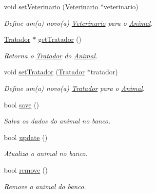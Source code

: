 \begin{DoxyCompactItemize}
void \hyperlink{classAnimal_ace9b58ea47057261292ce42a4edd2870}{set\+Veterinario} (\hyperlink{classVeterinario}{Veterinario} $\ast$veterinario)
\begin{DoxyCompactList}\small\item\em Define um(a) novo(a) \hyperlink{classVeterinario}{Veterinario} para o \hyperlink{classAnimal}{Animal}. \end{DoxyCompactList}\item 
\hyperlink{classTratador}{Tratador} $\ast$ \hyperlink{classAnimal_ac238dd4fa3762c7bc97f7baebac2d828}{get\+Tratador} ()
\begin{DoxyCompactList}\small\item\em Retorna o \hyperlink{classTratador}{Tratador} do \hyperlink{classAnimal}{Animal}. \end{DoxyCompactList}\item 
void \hyperlink{classAnimal_aec8cd2eec7a0c833074e303f389c8f9f}{set\+Tratador} (\hyperlink{classTratador}{Tratador} $\ast$tratador)
\begin{DoxyCompactList}\small\item\em Define um(a) novo(a) \hyperlink{classTratador}{Tratador} para o \hyperlink{classAnimal}{Animal}. \end{DoxyCompactList}\item 
bool \hyperlink{classAnimal_a0733e9c19d226749195ebe9e64df8964}{save} ()
\begin{DoxyCompactList}\small\item\em Salva os dados do animal no banco. \end{DoxyCompactList}\item 
bool \hyperlink{classAnimal_a2b9de87e4f753fc9f92aeb012bf098c5}{update} ()
\begin{DoxyCompactList}\small\item\em Atualiza o animal no banco. \end{DoxyCompactList}\item 
bool \hyperlink{classAnimal_a0aea60eaeb4d8f1d68d2c37e279d2d20}{remove} ()
\begin{DoxyCompactList}\small\item\em Remove o animal do banco. \end{DoxyCompactList}\end{DoxyCompactItemize}

